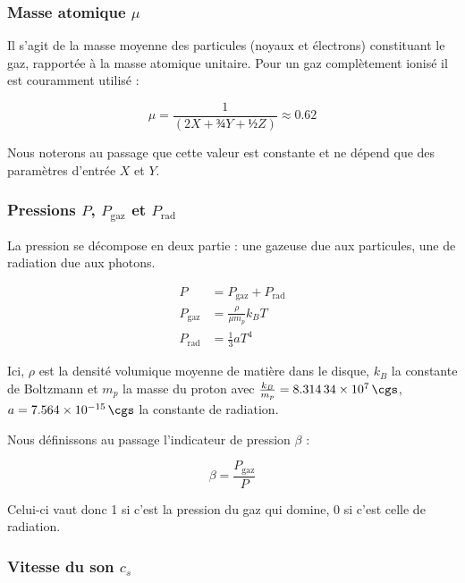 \subsubsection{\texorpdfstring{Masse atomique $\mu$}{Masse atomique μ}}

Il s’agit de la masse moyenne des particules (noyaux et électrons) constituant
le gaz, rapportée à la masse atomique unitaire. Pour un gaz complètement ionisé
il est couramment utilisé :

\begin{equation}
    \label{eq:masse_atomique}
    \mu = \frac{1}{\left(2X + ¾Y + ½Z\right)} \approx 0.62
\end{equation}

Nous noterons au passage que cette valeur est constante et ne dépend que des
paramètres d’entrée $X$ et $Y$.

\subsubsection{\texorpdfstring{Pressions $P$, $P_\mathrm{gaz}$ et $P_\mathrm{rad}$}{Pressions P, Pgaz et Prad}}

La pression se décompose en deux partie : une gazeuse due aux particules, une de radiation due aux photons.

\begin{align}
    \label{eq:pression}
    P &= P_{\mathrm{gaz}} + P_{\mathrm{rad}} \\
    P_{\mathrm{gaz}} &= \frac{\rho}{\mu m_p} k_B T \\
    P_{\mathrm{rad}} &= \frac{1}{3} a T^4
\end{align}

Ici, $\rho$ est la densité volumique moyenne de matière dans le disque, $k_B$
la constante de Boltzmann et $m_p$ la masse du proton avec $\frac{k_B}{m_p} =
\SI{8.31434e7}{\cgs}$, $a = \SI{7.564e-15}{\cgs}$ la constante de radiation.

Nous définissons au passage l’indicateur de pression $\beta$ :

\begin{equation}
    \label{eq:beta}
    \beta = \frac{P_{\mathrm{gaz}}}{P}
\end{equation}

Celui-ci vaut donc 1 si c’est la pression du gaz qui domine, 0 si c’est celle de radiation.

\subsubsection{\texorpdfstring{Vitesse du son $c_s$}{Vitesse du son cs}}

